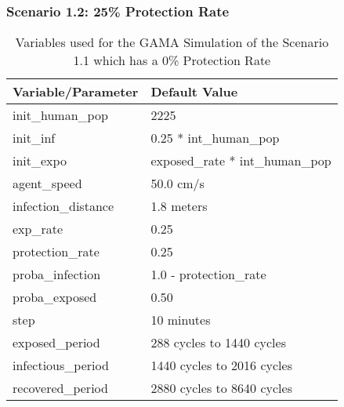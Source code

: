 	\subsubsection{ Scenario 1.2: 25\% Protection Rate}
	\begin{table}[H]
		\centering
		{\begin{tabular}{ll}
			\toprule
			\textbf{Variable/}\textbf{Parameter} & \textbf{Default Value}\\
			\hline
			init\_human\_pop & 2225\\
			init\_inf & 0.25 * int\_human\_pop\\
			init\_expo & exposed\_rate * int\_human\_pop \\
			agent\_speed & 50.0 cm/s\\
			infection\_distance & 1.8 meters\\
			exp\_rate & 0.25\\
			protection\_rate & 0.25\\
			proba\_infection & 1.0 - protection\_rate\\
			proba\_exposed & 0.50\\
			step & 10 minutes\\
			exposed\_period & 288 cycles to 1440 cycles\\
			infectious\_period & 1440 cycles to 2016 cycles\\
			recovered\_period & 2880 cycles to 8640 cycles\\ 
			\bottomrule
		\end{tabular}
		\caption{Variables used for the GAMA Simulation of the Scenario 1.1 which has a 0\% Protection Rate}
		\label{1.2}}
	\end{table}
	
